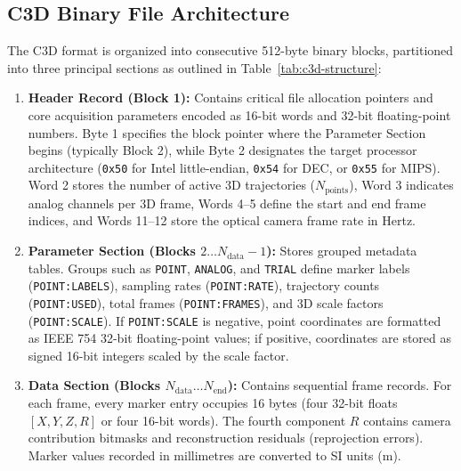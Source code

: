 \documentclass[12pt,a4paper]{article}
\begin{document}
\subsection{C3D Binary File Architecture}
The C3D format is organized into consecutive 512-byte binary blocks, partitioned into three principal sections as outlined in Table~\ref{tab:c3d-structure}:
\begin{enumerate}
    \item \textbf{Header Record (Block 1):} Contains critical file allocation pointers and core acquisition parameters encoded as 16-bit words and 32-bit floating-point numbers. Byte 1 specifies the block pointer where the Parameter Section begins (typically Block 2), while Byte 2 designates the target processor architecture (\texttt{0x50} for Intel little-endian, \texttt{0x54} for DEC, or \texttt{0x55} for MIPS). Word 2 stores the number of active 3D trajectories ($N_{\text{points}}$), Word 3 indicates analog channels per 3D frame, Words 4--5 define the start and end frame indices, and Words 11--12 store the optical camera frame rate in Hertz.
    \item \textbf{Parameter Section (Blocks $2 \dots N_{\text{data}}-1$):} Stores grouped metadata tables. Groups such as \texttt{POINT}, \texttt{ANALOG}, and \texttt{TRIAL} define marker labels (\texttt{POINT:LABELS}), sampling rates (\texttt{POINT:RATE}), trajectory counts (\texttt{POINT:USED}), total frames (\texttt{POINT:FRAMES}), and 3D scale factors (\texttt{POINT:SCALE}). If \texttt{POINT:SCALE} is negative, point coordinates are formatted as IEEE 754 32-bit floating-point values; if positive, coordinates are stored as signed 16-bit integers scaled by the scale factor.
    \item \textbf{Data Section (Blocks $N_{\text{data}} \dots N_{\text{end}}$):} Contains sequential frame records. For each frame, every marker entry occupies 16 bytes (four 32-bit floats $[X, Y, Z, R]$ or four 16-bit words). The fourth component $R$ contains camera contribution bitmasks and reconstruction residuals (reprojection errors). Marker values recorded in millimetres are converted to SI units ($\mathrm{m}$).
\end{enumerate}
\end{document}
